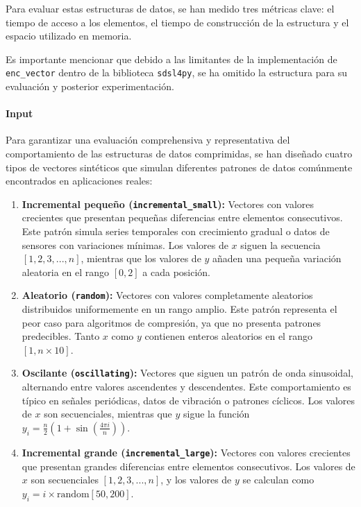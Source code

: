 Para evaluar estas estructuras de datos, se han medido tres métricas clave: el tiempo de acceso a los elementos, el tiempo de construcción de la estructura y el espacio utilizado en memoria. 

Es importante mencionar que debido a las limitantes de la implementación de \texttt{enc_vector} dentro de la biblioteca \texttt{sdsl4py}, se ha omitido la estructura para su evaluación y posterior experimentación. 

\paragraph{Input}
\vspace{0.2cm}

Para garantizar una evaluación comprehensiva y representativa del comportamiento de las estructuras de datos comprimidas, se han diseñado cuatro tipos de vectores sintéticos que simulan diferentes patrones de datos comúnmente encontrados en aplicaciones reales:

\begin{enumerate}
    \item \textbf{Incremental pequeño (\texttt{incremental\_small}):} Vectores con valores crecientes que presentan pequeñas diferencias entre elementos consecutivos. Este patrón simula series temporales con crecimiento gradual o datos de sensores con variaciones mínimas. Los valores de $x$ siguen la secuencia $[1, 2, 3, ..., n]$, mientras que los valores de $y$ añaden una pequeña variación aleatoria en el rango $[0, 2]$ a cada posición.

    \item \textbf{Aleatorio (\texttt{random}):} Vectores con valores completamente aleatorios distribuidos uniformemente en un rango amplio. Este patrón representa el peor caso para algoritmos de compresión, ya que no presenta patrones predecibles. Tanto $x$ como $y$ contienen enteros aleatorios en el rango $[1, n \times 10]$.

    \item \textbf{Oscilante (\texttt{oscillating}):} Vectores que siguen un patrón de onda sinusoidal, alternando entre valores ascendentes y descendentes. Este comportamiento es típico en señales periódicas, datos de vibración o patrones cíclicos. Los valores de $x$ son secuenciales, mientras que $y$ sigue la función $y_i = \frac{n}{2}(1 + \sin(\frac{4\pi i}{n}))$.

    \item \textbf{Incremental grande (\texttt{incremental\_large}):} Vectores con valores crecientes que presentan grandes diferencias entre elementos consecutivos. Los valores de $x$ son secuenciales $[1, 2, 3, ..., n]$, y los valores de $y$ se calculan como $y_i = i \times \text{random}[50, 200]$.
\end{enumerate}

